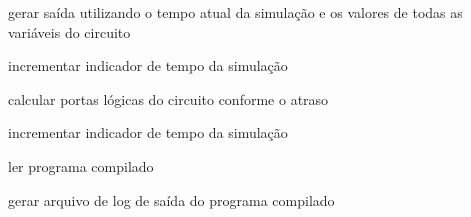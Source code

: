 \begin{algorithm}[ht]
{{{{                    gerar saída utilizando o tempo atual da simulação e os valores de todas as variáveis do circuito
                }

                \BlankLine

                incrementar indicador de tempo da simulação

                \BlankLine

            }

            \BlankLine


            {
                calcular portas lógicas do circuito conforme o atraso 

                incrementar indicador de tempo da simulação
            }

        }
        
    }
            
    \BlankLine

    \BlankLine


    \BlankLine

    {    
        ler programa compilado

        \BlankLine
        

        \BlankLine

        gerar arquivo de log de saída do programa compilado 

    } 

\end{algorithm}